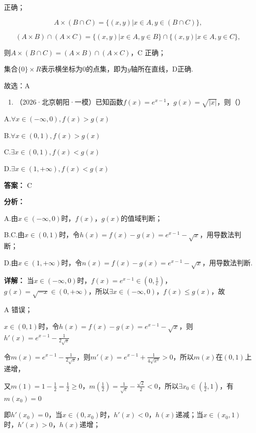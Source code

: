 \documentclass[11pt,a4paper]{ctexart}
\begin{document}
正确；

\[
A \times (B \cap C) = \{(x, y) | x \in A, y \in (B \cap C) \},
\]

\[
(A \times B) \cap (A \times C) = \{(x, y) | x \in A, y \in B \} \cap \{(x, y) | x \in A, y \in C \},
\]

则\(A \times (B \cap C) = (A \times B) \cap (A \times C)\)，C 正确；

集合\(\{0\} \times R\)表示横坐标为0的点集，即为\(y\)轴所在直线，D正确.

故选：A

\begin{enumerate}[label=\arabic*., leftmargin=*, start=19]
\item （2026·北京朝阳·一模）已知函数\(f(x) = e^{x - 1}\)，\(g(x) = \sqrt{|x|}\)，则（）
\end{enumerate}

A.\(\forall x\in (-\infty ,0),f(x) > g(x)\)

B.\(\forall x\in (0,1),f(x) > g(x)\)

C.\(\exists x\in (0,1),f(x) <   g(x)\)

D.\(\exists x\in (1, + \infty),f(x) <   g(x)\)

\textbf{答案：}
C

\textbf{分析：}

A.由\(x \in (-\infty, 0)\)时，\(f(x)\)，\(g(x)\)的值域判断；

B.C.由\(x \in (0, 1)\)时，令\(h(x) = f(x) - g(x) = e^{x-1} - \sqrt{x}\)，用导数法判断；

D.由\(x \in (1, +\infty)\)时，令\(n(x) = f(x) - g(x) = e^{x-1} - \sqrt{x}\)，用导数法判断.

\textbf{详解：}
当\(x \in (-\infty, 0)\)时，\(f(x) = e^{x-1} \in \left(0, \frac{1}{e}\right)\)，\(g(x) = \sqrt{-x} \in (0, +\infty)\)，所以\(\exists x \in (-\infty, 0)\)，\(f(x) \leq g(x)\)，故

A 错误；

\(x \in (0,1)\)时，令\(h(x) = f(x) - g(x) = e^{x - 1} - \sqrt{x}\)，则\(h'(x) = e^{x - 1} - \frac{1}{2\sqrt{x}}\)

令\(m(x)=e^{x-1}-\frac{1}{2\sqrt{x}}\)，则\(m'(x)=e^{x-1}+\frac{1}{4\sqrt{x^{3}}}>0\)，所以\(m(x)\)在\((0,1)\)上递增，

又\(m(1) = 1 - \frac{1}{2} = \frac{1}{2} \geq 0\)，\(m\left(\frac{1}{2}\right) = \frac{1}{\sqrt{e}} - \frac{\sqrt{2}}{2} < 0\)，所以\(\exists x_0 \in \left(\frac{1}{2}, 1\right)\)，有\(m(x_0) = 0\)

即\(h'(x_0) = 0\)，当\(x \in (0, x_0)\)时，\(h'(x) < 0\)，\(h(x)\)递减；当\(x \in (x_0, 1)\)时，\(h'(x) > 0\)，\(h(x)\)递增；
\end{document}
